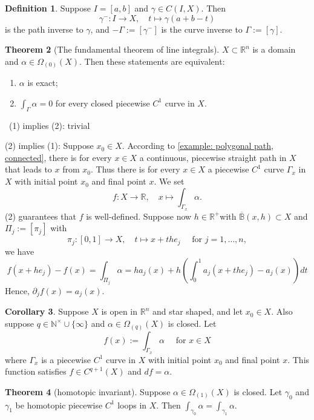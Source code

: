 \documentclass[12pt,a4paper]{book}
\newenvironment{prooff}{{\noindent\it\textcolor{cyan!40!black}{Proof}:}\,}{\par}
\newenvironment{enu}{\begin{enumerate}[(1)]}{\end{enumerate}}
\theoremstyle{definition}
\newtheorem{defn}{Definition}[section]
\newtheorem{coro}[defn]{Corollary}
\newtheorem{theo}[defn]{Theorem}
\begin{document}
\begin{defn}
    Suppose $I=[a, b]$ and $\gamma \in C(I, X)$. Then
    $$
    \gamma^{-}: I \rightarrow X, \quad t \mapsto \gamma(a+b-t)
    $$
    is the path inverse to $\gamma$, and $-\Gamma:=\left[\gamma^{-}\right]$ is the curve inverse to $\Gamma:=[\gamma]$.
\end{defn}
\begin{theo}[The fundamental theorem of line integrals]
    $X \subset \mathbb{R}^n$ is a domain and $\alpha \in \Omega_{(0)}(X)$. Then these statements are equivalent:
\begin{enu} 
    \item $\alpha$ is exact;
    \item $\int_{\Gamma} \alpha=0$ for every closed piecewise $C^1$ curve in $X$.
\end{enu}
\end{theo}
\begin{prooff}
    (1) implies (2): trivial 

    (2) implies (1): 
Suppose $x_0 \in X$. According to \ref{example: polygonal path, connected}, 
there is for every $x \in X$ a continuous, piecewise straight path in $X$ that leads to $x$ from $x_0$. Thus there is for every $x \in X$ a piecewise $C^1$ curve $\Gamma_x$ in $X$ with initial point $x_0$ and final point $x$. We set
$$
f: X \rightarrow \mathbb{R}, \quad x \mapsto \int_{\Gamma_x} \alpha .
$$
(2) guarantees that $f$ is well-defined. 
Suppose now $h \in \mathbb{R}^{+}$with $\overline{\mathbb{B}}(x, h) \subset X$ and $\Pi_j:=\left[\pi_j\right]$ with
$$
\pi_j:[0,1] \rightarrow X, \quad t \mapsto x+t h e_j \quad \text { for } j=1, \ldots, n,
$$
we have
$$
f\left(x+h e_j\right)-f(x)=\int_{\Pi_j} \alpha= ha_j(x)+h(\int_0^1  a_j(x+the_j)-a_j(x))dt
$$
Hence, $\partial_j f (x)=a_j(x)$. 
\end{prooff}
\begin{coro}
    Suppose $X$ is open in $\mathbb{R}^n$ and star shaped, and let $x_0 \in X$. Also suppose $q \in \mathbb{N}^{\times} \cup\{\infty\}$ and $\alpha \in \Omega_{(q)}(X)$ is closed. Let
    $$
    f(x):=\int_{\Gamma_x} \alpha \quad \text { for } x \in X
    $$
    where $\Gamma_x$ is a piecewise $C^1$ curve in $X$ with initial point $x_0$ and final point $x$. This function satisfies $f \in C^{q+1}(X)$ and $d f=\alpha$.
\end{coro}
\begin{theo}[homotopic invariant]
    Suppose $\alpha \in \Omega_{(1)}(X)$ is closed. Let $\gamma_0$ and $\gamma_1$ be homotopic piecewise $C^1$ loops in $X$. Then $\int_{\gamma_0} \alpha=\int_{\gamma_1} \alpha$.
\end{theo}
\end{document}

